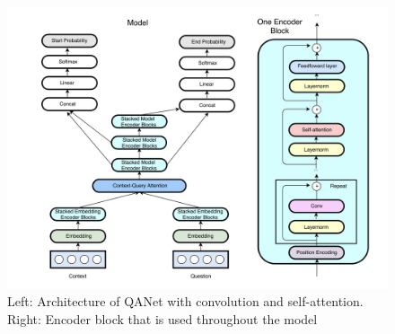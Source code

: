 \documentclass{article}
\begin{document}
\begin{figure}[h]
\centering
\includegraphics[scale=0.3]{model_diagram}
\caption{Left: Architecture of QANet with convolution and self-attention. Right: Encoder block that is used throughout the model}
\end{figure}
\end{document}
